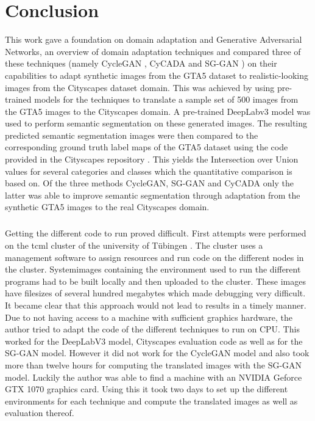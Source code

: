\chapter{Conclusion}
\label{sec:conclusion}

This work gave a foundation on domain adaptation and Generative Adversarial Networks, an overview of domain adaptation techniques and compared three of these techniques (namely CycleGAN \cite{DBLP:journals/corr/ZhuPIE17}, CyCADA \cite{DBLP:journals/corr/abs-1711-03213} and SG-GAN \cite{DBLP:journals/corr/abs-1801-01726}) on their capabilities to adapt synthetic images from the GTA5 dataset \cite{Richter_2016_ECCV} to realistic-looking images from the Cityscapes dataset \cite{Cordts_2016_CVPR} domain. This was achieved by using pre-trained models for the techniques to translate a sample set of 500 images from the GTA5 images to the Cityscapes domain. A pre-trained DeepLabv3 \cite{DBLP:journals/corr/ChenPSA17} model was used to perform semantic segmentation on these generated images. The resulting predicted semantic segmentation images were then compared to the corresponding ground truth label maps of the GTA5 dataset using the code provided in the Cityscapes repository \cite{CSR}. This yields the Intersection over Union values for several categories and classes which the quantitative comparison is based on.
Of the three methods CycleGAN, SG-GAN and CyCADA only the latter was able to improve semantic segmentation through adaptation from the synthetic GTA5 images to the real Cityscapes domain.

\paragraph{}
Getting the different code to run proved difficult. First attempts were performed on the tcml cluster of the university of Tübingen \cite{tcml}. The cluster uses a management software to assign resources and run code on the different nodes in the cluster. Systemimages containing the environment used to run the different programs had to be built locally and then uploaded to the cluster. These images have filesizes of several hundred megabytes which made debugging very difficult. It became clear that this approach would not lead to results in a timely manner. Due to not having access to a machine with sufficient graphics hardware, the author tried to adapt the code of the different techniques to run on CPU. This worked for the DeepLabV3 model, Cityscapes evaluation code as well as for the SG-GAN model. However it did not work for the CycleGAN model and also took more than twelve hours for computing the translated images with the SG-GAN model. Luckily the author was able to find a machine with an NVIDIA Geforce GTX 1070 graphics card. Using this it took two days to set up the different environments for each technique and compute the translated images as well as evaluation thereof. 


